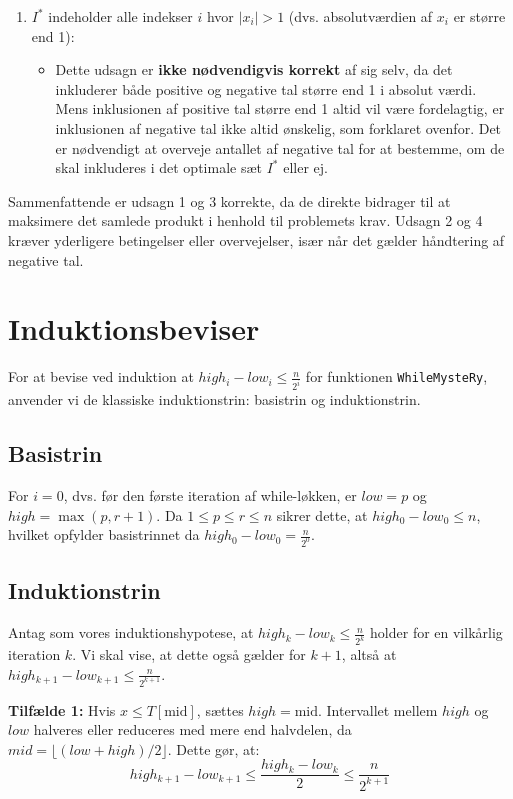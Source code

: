 \documentclass{article}
\begin{document}
\begin{enumerate}
    \item $I^*$ indeholder alle indekser $i$ hvor $|x_i| > 1$ (dvs. absolutværdien af $x_i$ er større end 1):
    \begin{itemize}
        \item Dette udsagn er \textbf{ikke nødvendigvis korrekt} af sig selv, da det inkluderer både positive og negative tal større end 1 i absolut værdi. Mens inklusionen af positive tal større end 1 altid vil være fordelagtig, er inklusionen af negative tal ikke altid ønskelig, som forklaret ovenfor. Det er nødvendigt at overveje antallet af negative tal for at bestemme, om de skal inkluderes i det optimale sæt $I^*$ eller ej.
    \end{itemize}
\end{enumerate}

Sammenfattende er udsagn 1 og 3 korrekte, da de direkte bidrager til at maksimere det samlede produkt i henhold til problemets krav. Udsagn 2 og 4 kræver yderligere betingelser eller overvejelser, især når det gælder håndtering af negative tal.

\section{Induktionsbeviser}

For at bevise ved induktion at $high_i - low_i \leq \frac{n}{2^i}$ for funktionen \texttt{WhileMysteRy}, anvender vi de klassiske induktionstrin: basistrin og induktionstrin.

\subsection*{Basistrin}

For $i = 0$, dvs. før den første iteration af while-løkken, er $low = p$ og $high = \max(p, r+1)$. Da $1 \leq p \leq r \leq n$ sikrer dette, at $high_0 - low_0 \leq n$, hvilket opfylder basistrinnet da $high_0 - low_0 = \frac{n}{2^0}$.

\subsection*{Induktionstrin}

Antag som vores induktionshypotese, at $high_k - low_k \leq \frac{n}{2^k}$ holder for en vilkårlig iteration $k$. Vi skal vise, at dette også gælder for $k+1$, altså at $high_{k+1} - low_{k+1} \leq \frac{n}{2^{k+1}}$.

\textbf{Tilfælde 1:} Hvis $x \leq T[\text{mid}]$, sættes $high = \text{mid}$. Intervallet mellem $high$ og $low$ halveres eller reduceres med mere end halvdelen, da $mid = \lfloor (low + high) / 2 \rfloor$. Dette gør, at:
\begin{equation}
high_{k+1} - low_{k+1} \leq \frac{high_k - low_k}{2} \leq \frac{n}{2^{k+1}}
\end{equation}
\end{document}
